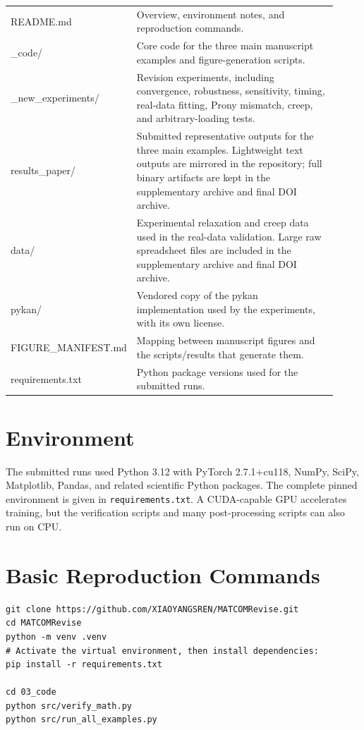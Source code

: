 \documentclass[11pt]{article}
\begin{document}
\begin{tabular}{>{\ttfamily}p{0.30\linewidth}p{0.62\linewidth}}
README.md & Overview, environment notes, and reproduction commands.\\
03\_code/ & Core code for the three main manuscript examples and figure-generation scripts.\\
04\_new\_experiments/ & Revision experiments, including convergence, robustness, sensitivity, timing, real-data fitting, Prony mismatch, creep, and arbitrary-loading tests.\\
results\_paper/ & Submitted representative outputs for the three main examples. Lightweight text outputs are mirrored in the repository; full binary artifacts are kept in the supplementary archive and final DOI archive.\\
data/ & Experimental relaxation and creep data used in the real-data validation. Large raw spreadsheet files are included in the supplementary archive and final DOI archive.\\
pykan/ & Vendored copy of the pykan implementation used by the experiments, with its own license.\\
FIGURE\_MANIFEST.md & Mapping between manuscript figures and the scripts/results that generate them.\\
requirements.txt & Python package versions used for the submitted runs.\\
\end{tabular}

\section*{Environment}

The submitted runs used Python 3.12 with PyTorch 2.7.1+cu118, NumPy, SciPy, Matplotlib, Pandas, and related scientific Python packages. The complete pinned environment is given in \texttt{requirements.txt}. A CUDA-capable GPU accelerates training, but the verification scripts and many post-processing scripts can also run on CPU.

\section*{Basic Reproduction Commands}

\begin{verbatim}
git clone https://github.com/XIAOYANGSREN/MATCOMRevise.git
cd MATCOMRevise
python -m venv .venv
# Activate the virtual environment, then install dependencies:
pip install -r requirements.txt

cd 03_code
python src/verify_math.py
python src/run_all_examples.py
\end{verbatim}
\end{document}
